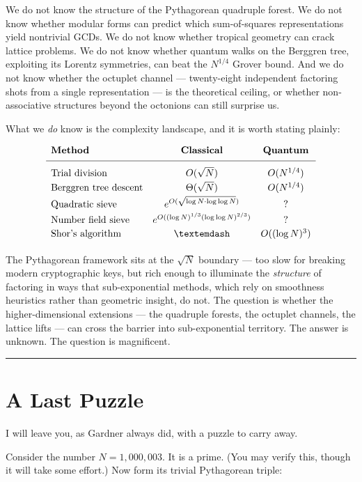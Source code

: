 We do not know the structure of the Pythagorean quadruple forest. We do not know whether modular forms can predict which sum-of-squares representations yield nontrivial GCDs. We do not know whether tropical geometry can crack lattice problems. We do not know whether quantum walks on the Berggren tree, exploiting its Lorentz symmetries, can beat the \(N^{1/4}\) Grover bound. And we do not know whether the octuplet channel --- twenty-eight independent factoring shots from a single representation --- is the theoretical ceiling, or whether non-associative structures beyond the octonions can still surprise us.

What we \emph{do} know is the complexity landscape, and it is worth stating plainly:

\[
\begin{array}{lcc}
\textbf{Method} & \textbf{Classical} & \textbf{Quantum} \\[4pt]
\hline
\\[-6pt]
\text{Trial division} & O(\sqrt{N}) & O(N^{1/4}) \\[2pt]
\text{Berggren tree descent} & \Theta(\sqrt{N}) & O(N^{1/4}) \\[2pt]
\text{Quadratic sieve} & e^{O(\sqrt{\log N \cdot \log\log N})} & ? \\[2pt]
\text{Number field sieve} & e^{O((\log N)^{1/3}(\log\log N)^{2/3})} & ? \\[2pt]
\text{Shor's algorithm} & — & O((\log N)^3) \\[2pt]
\end{array}
\]

The Pythagorean framework sits at the \(\sqrt{N}\) boundary --- too slow for breaking modern cryptographic keys, but rich enough to illuminate the \emph{structure} of factoring in ways that sub-exponential methods, which rely on smoothness heuristics rather than geometric insight, do not. The question is whether the higher-dimensional extensions --- the quadruple forests, the octuplet channels, the lattice lifts --- can cross the barrier into sub-exponential territory. The answer is unknown. The question is magnificent.

\bigskip\noindent\rule{\linewidth}{0.4pt}\bigskip

\section*{A Last Puzzle}
I will leave you, as Gardner always did, with a puzzle to carry away.

Consider the number \(N = 1{,}000{,}003\). It is a prime. (You may verify this, though it will take some effort.) Now form its trivial Pythagorean triple:


